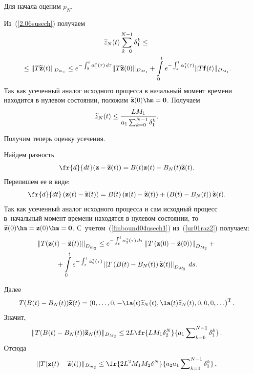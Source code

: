 \smallskip

Для начала оценим $p_N$.

Из~(\ref{2.06susech}) получаем
\begin{multline*}
 \widetilde{z}_N(t)\sum\limits_{k=0}^{N-1}\delta_1^{k}
\le{}\\
{}\le
\|T\widetilde{\mathbf z}(t)\|_{D_{m_1}} \le  e^{-\int\nolimits_0^t\alpha_1^*(\tau)\, d\tau}\|T\widetilde{\mathbf z}(0)\|_{D_{M_1}}+
\int\limits_0^t e^{-\int\nolimits_s^t\alpha_1^*(\tau)} \|T{\mathbf f}(t)\|_{D_{M_1}}.
\end{multline*}
Так как усеченный аналог исходного процесса в начальный момент времени 
находится в нулевом состоянии, положим $\vwz(0)\hm={\mathbf 0}$.  Получаем
\begin{equation*}
\widetilde{z}_N(t)
\le
\frac{LM_1}{a_1\sum\nolimits_{k=0}^{N-1}\delta_1^{k}}.
\end{equation*}

\smallskip

Получим теперь оценку усечения.

Найдем разность
\begin{equation*}
\fr{d}{dt}(\vz-\vwz(t))=B(t)\vz(t)-B_N(t)\vwz(t).
\end{equation*}
Перепишем ее в виде:
\begin{equation}
\fr{d}{dt}\left(\vz(t)-\vwz(t)\right)=B(t)\left(\vz(t)-\vwz(t)\right)+\left(B(t)-B_N(t)\right)\vwz(t).
\label{ur01raz2}
\end{equation}
Так как усеченный аналог исходного процесса и сам исходный процесс 
в~начальный момент времени находятся в нулевом состоянии, то $\vwz(0)\hm=\vz(0)\hm={\mathbf 0}$.
С~учетом~(\ref{finbound04usech1}) из~(\ref{ur01raz2}) получаем:
\begin{multline*}
\left\|T({\mathbf z}(t)-\widetilde{\mathbf z}(t))\right\|_{D_{m_2}}\le e^{-\int\nolimits_0^t\alpha_2^*(\tau)\, d\tau}\left\|
T\left({\mathbf z}(0)-\widetilde{\mathbf z}(0)\right)\right\|_{D_{M_2}}+{}\\
{}+
\int\limits_0^t e^{-\int\nolimits_s^t\alpha_2^*(\tau)} \left\|
T\left(B(t)-B_N(t)\right)\widetilde{\mathbf z}(t)\right\|_{D_{M_2}}\,ds.
\end{multline*}

Далее
\begin{equation*}
T(B(t)-B_N(t))\vwz(t)=\left(0,\ldots,0,-\la(t) \wwz_N(t),\la(t) \wwz_N(t),0,0,0,\ldots\right)^{\mathrm{T}}.
\end{equation*}
Значит,
\begin{equation*}
\|T(B(t)-B_N(t))\vwz_N(t)\|_{D_{M_2}}\le 2 L  \fr{LM_1 \delta_2^N}
{a_1\sum\nolimits_{k=0}^{N-1}\delta_1^{k}}\,.
\end{equation*}
Отсюда
\begin{equation*}
\|T(\vz(t)-\vwz(t))\|_{D_{m_2}}\le
\fr{2L^2M_1 M_2 \delta^N}{a_2a_1\sum\nolimits_{k=0}^{N-1}\delta_1^{k}}\,.
\end{equation*}

